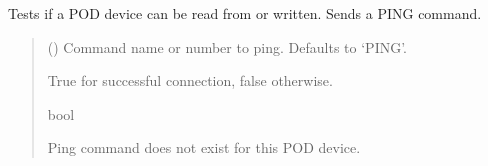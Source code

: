\documentclass[letterpaper,10pt,english]{sphinxmanual}
\begin{document}
\begin{fulllineitems}
\begin{fulllineitems}
\label{\detokenize{PodApi.Devices:PodApi.Devices.BasicPodProtocol.Pod.TestConnection}}
\pysigstartsignatures
{}
\pysigstopsignatures
\sphinxAtStartPar
Tests if a POD device can be read from or written. Sends a PING command.
\begin{quote}\begin{description}
\sphinxAtStartPar
{} (\sphinxstyleliteralemphasis{\sphinxupquote{ | }}\sphinxstyleliteralemphasis{\sphinxupquote{, }}) \textendash{} Command name or number to ping. Defaults to ‘PING’.

\sphinxAtStartPar
True for successful connection, false otherwise.

\sphinxAtStartPar
bool

\sphinxAtStartPar
{} \textendash{} Ping command does not exist for this POD device.

\end{description}\end{quote}

\end{fulllineitems}



\end{fulllineitems}
\end{document}
